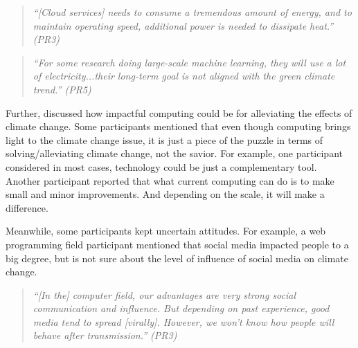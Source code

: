     \begin{quote}
        \textit{
        “[Cloud services] needs to consume a tremendous amount of energy, and to maintain operating speed, additional power is needed to dissipate heat.” (PR3)
        }
    \end{quote}
    
    \begin{quote}
        \textit{
        “For some research doing large-scale machine learning, they will use a lot of electricity...their long-term goal is not aligned with the green climate trend.” (PR5)
        }
    \end{quote}
    
    Further, discussed how impactful computing could be for alleviating the effects of climate change. Some participants mentioned that even though computing brings light to the climate change issue, it is just a piece of the puzzle in terms of solving/alleviating climate change, not the savior. For example, one participant considered in most cases, technology could be just a complementary tool. Another participant reported that what current computing can do is to make small and minor improvements. And depending on the scale, it will make a difference.
    
    Meanwhile, some participants kept uncertain attitudes. For example, a web programming field participant mentioned that social media impacted people to a big degree, but is not sure about the level of influence of social media on climate change.
    
    \begin{quote}
        \textit{
        “[In the] computer field, our advantages are very strong social communication and influence. But depending on past experience, good media tend to spread [virally]. However, we won't know how people will behave after transmission.” (PR3)
        }
    \end{quote}
    
